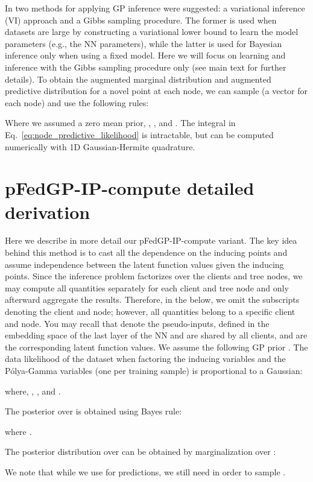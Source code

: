 \documentclass{article}
\def\Eqref#1{Eq.~\ref{#1}}
\newcommand{\pg}{P\'olya-Gamma }
\begin{document}
In \cite{achituve2021gp_icml} two methods for applying GP inference were suggested: a variational inference (VI) approach and a Gibbs sampling procedure. The former is used when datasets are large by constructing a variational lower bound to learn the model parameters (e.g., the NN parameters), while the latter is used for Bayesian inference only when using a fixed model. Here we will focus on learning and inference with the Gibbs sampling procedure only (see main text for further details). To obtain the augmented marginal distribution and augmented predictive distribution for a novel point  at each node, we can sample  (a vector for each node) and use the following rules:




Where we assumed a zero mean prior, , , and . The integral in \Eqref{eq:node_predictive_likelihood} is intractable, but can be computed numerically with 1D Gaussian-Hermite quadrature.

\section{pFedGP-IP-compute detailed derivation} \label{sec_app:pFedGP_comp_derivation}
Here we describe in more detail our pFedGP-IP-compute variant. 
The key idea behind this method is to cast all the dependence on the inducing points and assume independence between the latent function values given the inducing points. Since the inference problem factorizes over the clients and tree nodes, we may compute all quantities separately for each client and tree node and only afterward aggregate the results. Therefore, in the below, we omit the subscripts denoting the client and node; however, all quantities belong to a specific client and node. You may recall that  denote the pseudo-inputs, defined in the embedding space of the last layer of the NN and are shared by all clients, and  are the corresponding latent function values. We assume the following GP prior . The data likelihood of the dataset when factoring the inducing variables and the \pg variables (one per training sample) is proportional to a Gaussian:

where, , , and . 

The posterior over  is obtained using Bayes rule:

where .

The posterior distribution over  can be obtained by marginalization over :

We note that while we use  for predictions, we still need  in order to sample .
\end{document}

